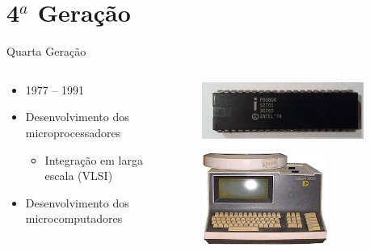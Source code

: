 \documentclass[aspectratio=169,
				xcolor=table]{beamer}
\begin{document}
	\section{4${}^a$ Geração}
	\begin{frame}[t]{Quarta Geração}
		\begin{columns}[t]
			\begin{column}{0.7\textwidth}
			\begin{itemize}
				\item 1977 – 1991
				\vspace{1em}
				\item Desenvolvimento dos microprocessadores
				\begin{itemize}
					\item Integração em larga escala (VLSI)
				\end{itemize}
				\vspace{1em}
				\item Desenvolvimento dos microcomputadores
			\end{itemize}
			\end{column}
			\begin{column}{0.3\textwidth}
				\begin{figure}
					\centering
					\includegraphics[width=0.9\textwidth, keepaspectratio]{../figs/cap03/geracao41} 			
				\end{figure}
				\begin{figure}
					\centering
					\includegraphics[height=3cm, keepaspectratio]{../figs/cap03/geracao42} 			
				\end{figure}				
			\end{column}
		\end{columns}
	\end{frame}
\end{document}
